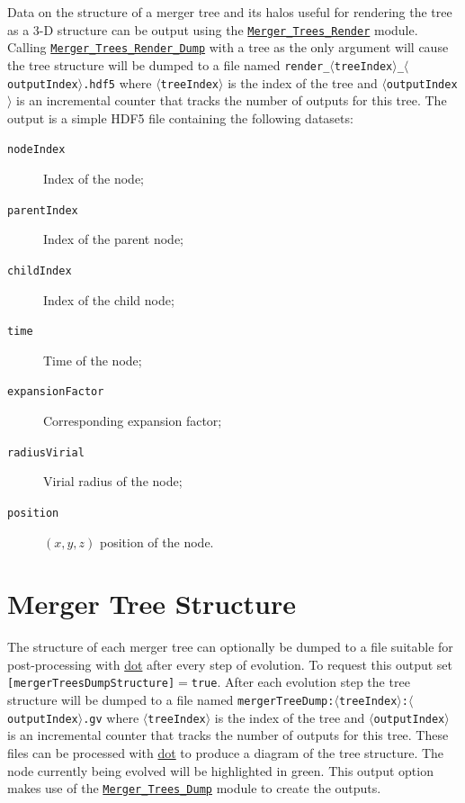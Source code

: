 Data on the structure of a merger tree and its halos useful for rendering the tree as a 3-D structure can be output using the \hyperlink{merger_trees.render.F90:merger_trees_render}{\tt Merger\_Trees\_Render} module. Calling \hyperlink{merger_trees.render.F90:merger_trees_render:merger_trees_render_dump}{\tt Merger\_Trees\_Render\_Dump} with a tree as the only argument will cause the tree structure will be dumped to a file named {\tt render\_$\langle$treeIndex$\rangle$\_$\langle$outputIndex$\rangle$.hdf5} where $\langle${\tt treeIndex}$\rangle$ is the index of the tree and $\langle${\tt outputIndex}$\rangle$ is an incremental counter that tracks the number of outputs for this tree. The output is a simple HDF5 file containing the following datasets:
\begin{description}
 \item [{\tt nodeIndex}] Index of the node;
 \item [{\tt parentIndex}] Index of the parent node;
 \item [{\tt childIndex}] Index of the child node;
 \item [{\tt time}] Time of the node;
 \item [{\tt expansionFactor}] Corresponding expansion factor;
 \item [{\tt radiusVirial}] Virial radius of the node;
 \item [{\tt position}] $(x,y,z)$ position of the node.
\end{description}

\section{Merger Tree Structure}

The structure of each merger tree can optionally be dumped to a file suitable for post-processing with \href{http://www.graphviz.org/}{\sc dot} after every step of evolution. To request this output set {\tt [mergerTreesDumpStructure]}$=${\tt true}. After each evolution step the tree structure will be dumped to a file named {\tt mergerTreeDump:$\langle$treeIndex$\rangle$:$\langle$outputIndex$\rangle$.gv} where $\langle${\tt treeIndex}$\rangle$ is the index of the tree and $\langle${\tt outputIndex}$\rangle$ is an incremental counter that tracks the number of outputs for this tree. These files can be processed with \href{http://www.graphviz.org/}{\sc dot} to produce a diagram of the tree structure. The node currently being evolved will be highlighted in green. This output option makes use of the \hyperlink{objects.merger_trees.dump.F90:merger_trees_dump}{\tt Merger\_Trees\_Dump} module to create the outputs.

